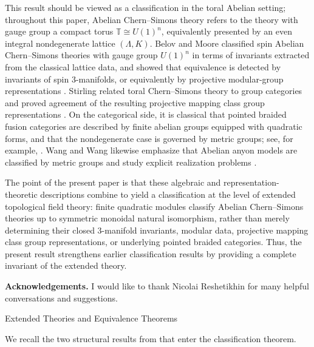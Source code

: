 \documentclass[12pt]{amsart}
\makeatletter
\renewcommand\section{\@startsection{section}{1}%
  \z@{.7\linespacing\@plus\linespacing}{.5\linespacing}%
  {\normalfont\bfseries\centering}}
\numberwithin{equation}{section}
\makeatother
\begin{document}
This result should be viewed as a classification in the toral Abelian setting; throughout this paper, Abelian Chern--Simons theory refers to the theory with gauge group a compact torus $\mathbb T\cong U(1)^n$, equivalently presented by an even integral nondegenerate lattice $(\Lambda,K)$.  Belov and Moore classified spin Abelian Chern--Simons theories with gauge group $U(1)^n$ in terms of invariants extracted from the classical lattice data, and showed that equivalence is detected by invariants of spin $3$-manifolds, or equivalently by projective modular-group representations \cite{BelovMoore}. Stirling related toral Chern--Simons theory to group categories and proved agreement of the resulting projective mapping class group representations \cite{Stirling}. On the categorical side, it is classical that pointed braided fusion categories are described by finite abelian groups equipped with quadratic forms, and that the nondegenerate case is governed by metric groups; see, for example, \cite{Joyal-Street,DGNO2010}. Wang and Wang likewise emphasize that Abelian anyon models are classified by metric groups and study explicit realization problems \cite{WangWang2020}. 

The point of the present paper is that these algebraic and representation-theoretic descriptions combine to yield a classification at the level of extended topological field theory: finite quadratic modules classify Abelian Chern–Simons theories up to symmetric monoidal natural isomorphism, rather than merely determining their closed $3$-manifold invariants, modular data, projective mapping class group representations, or underlying pointed braided categories. Thus, the present result strengthens earlier classification results by providing a complete invariant of the extended theory.

\medskip

\textbf{Acknowledgements.} I would like to thank Nicolai Reshetikhin for many helpful conversations and suggestions.

\section{Extended Theories and Equivalence Theorems}
\label{section2}

We recall the two structural results from \cite{Galviz2,Galviz3} that
enter the classification theorem.
\end{document}
